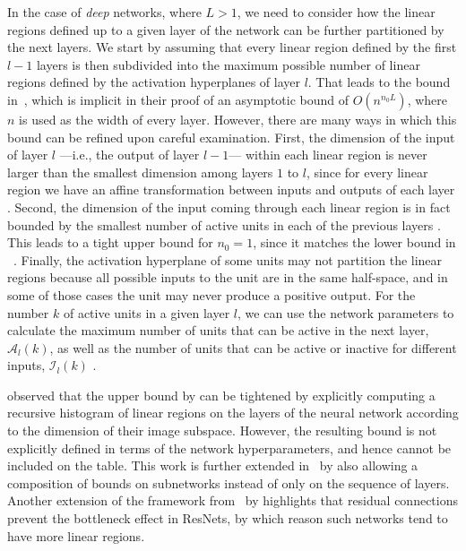 In the case of \emph{deep} networks, where $L > 1$, 
we need to consider how the linear regions defined up to a given layer of the network can be further partitioned by the next layers. 
%
We %
start by assuming that every linear region defined by the first $l-1$ layers 
is then subdivided into the maximum possible number of linear regions defined by the activation hyperplanes of layer $l$. 
That leads to the bound %
in~\cite{raghu2017expressive}, 
which is implicit in their proof of an asymptotic bound of $O(n^{n_0 L})$, where $n$ is used as the width of every layer. %
However, there are many ways in which this bound can be refined upon careful examination. 
First, the dimension of the input of layer $l$ ---i.e., the output of layer $l-1$--- within each linear region is never larger than the smallest dimension among layers $1$ to $l$, since for every linear region we have an affine transformation between inputs and outputs of each layer \citep{montufar2017notes}.  
Second, the dimension of the input coming through each linear region is in fact bounded by the smallest number of active units in each of the previous layers \citep{serra2018bounding}.  
This leads to a tight upper bound for $n_0=1$, since it matches the lower bound in ~\cite{serra2018bounding}. 
Finally, 
the activation hyperplane of some units may not partition the linear regions because all possible inputs to the unit are in the same half-space, and in some of those cases the unit may never produce a positive output. 
For the number $k$ of active units in a given layer $l$, we can use the network parameters to calculate the maximum number of units that can be active in the next layer, $\mathcal{A}_l(k)$, as well as the number of units that can be active or inactive for different inputs, $\mathcal{I}_{l}(k)$ \citep{serra2020empirical}. 

\cite{hinz2019framework} observed that the upper bound by \cite{serra2018bounding} can be tightened by explicitly computing a recursive histogram of linear regions on the layers of the neural network according to the dimension of their image subspace. However, the resulting bound is not explicitly defined in terms of the network hyperparameters, and hence cannot be included on the table. This work is further extended in~\cite{hinz2021histograms} by also allowing a composition of bounds on subnetworks instead of only on the sequence of layers. 
Another extension of the framework from~\cite{hinz2019framework} by \cite{yutong2020framework} highlights that residual connections prevent the bottleneck effect in ResNets, 
by which reason such networks tend to have more linear regions. 

